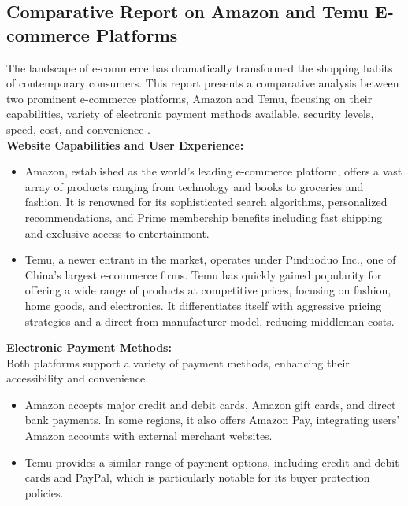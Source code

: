 \documentclass[12pt,a4paper]{article}
\begin{document}
\subsection{Comparative Report on Amazon and Temu E-commerce Platforms}
\label{sec:Question 4}

\noindent The landscape of e-commerce has dramatically transformed the shopping habits of contemporary consumers. This report presents a comparative analysis between two prominent e-commerce platforms, Amazon and Temu, focusing on their capabilities, variety of electronic payment methods available, security levels, speed, cost, and convenience \citep{Ref4.1}.\\

\noindent\textbf{Website Capabilities and User Experience: }
\begin{itemize}
    \item Amazon, established as the world’s leading e-commerce platform, offers a vast array of products ranging from technology and books to groceries and fashion. It is renowned for its sophisticated search algorithms, personalized recommendations, and Prime membership benefits including fast shipping and exclusive access to entertainment.
    \item Temu, a newer entrant in the market, operates under Pinduoduo Inc., one of China's largest e-commerce firms. Temu has quickly gained popularity for offering a wide range of products at competitive prices, focusing on fashion, home goods, and electronics. It differentiates itself with aggressive pricing strategies and a direct-from-manufacturer model, reducing middleman costs.
\end{itemize}

\noindent\textbf{Electronic Payment Methods:}\\
\noindent Both platforms support a variety of payment methods, enhancing their accessibility and convenience.
\begin{itemize}
    \item Amazon accepts major credit and debit cards, Amazon gift cards, and direct bank payments. In some regions, it also offers Amazon Pay, integrating users' Amazon accounts with external merchant websites.
    \item Temu provides a similar range of payment options, including credit and debit cards and PayPal, which is particularly notable for its buyer protection policies.
\end{itemize}
\end{document}
